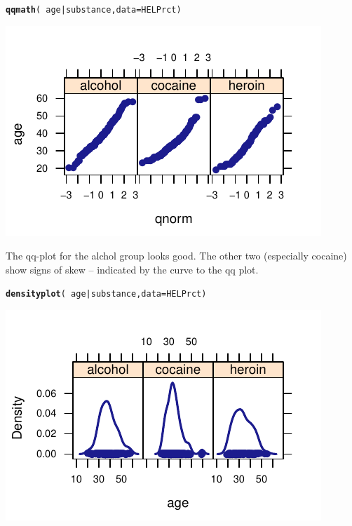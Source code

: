 \documentclass[twoside]{book}\usepackage[]{graphicx}\usepackage[]{xcolor}
\makeatletter
\def\maxwidth{ %
  \ifdim\Gin@nat@width>\linewidth
    \linewidth
  \else
    \Gin@nat@width
  \fi
}
\newcommand{\hlopt}[1]{\textcolor[rgb]{0,0,0}{#1}}%
\newcommand{\hlstd}[1]{\textcolor[rgb]{0.345,0.345,0.345}{#1}}%
\newcommand{\hlkwc}[1]{\textcolor[rgb]{0.333,0.667,0.333}{#1}}%
\newcommand{\hlkwd}[1]{\textcolor[rgb]{0.737,0.353,0.396}{\textbf{#1}}}%
\newenvironment{kframe}{%
 \def\at@end@of@kframe{}%
 \ifinner\ifhmode%
  \def\at@end@of@kframe{\end{minipage}}%
  \begin{minipage}{\columnwidth}%
 \fi\fi%
 \def\FrameCommand##1{\hskip\@totalleftmargin \hskip-\fboxsep
 \colorbox{shadecolor}{##1}\hskip-\fboxsep
     \hskip-\linewidth \hskip-\@totalleftmargin \hskip\columnwidth}%
 \MakeFramed {\advance\hsize-\width
   \@totalleftmargin\z@ \linewidth\hsize
   \@setminipage}}%
 {\par\unskip\endMakeFramed%
 \at@end@of@kframe}
\newenvironment{knitrout}{}{} %
\makeatother
\begin{document}
\begin{solution}
\begin{knitrout}
\color{fgcolor}\begin{kframe}
\begin{alltt}
\hlkwd{qqmath}\hlstd{(}\hlopt{~}\hlstd{age} \hlopt{|} \hlstd{substance,} \hlkwc{data} \hlstd{= HELPrct)}
\end{alltt}
\end{kframe}

{\centering \includegraphics[width=\maxwidth]{figures/fig-unnamed-chunk-121-1} 

}



\end{knitrout}
The qq-plot for the alchol group looks good.  The other two (especially cocaine) show
signs of skew -- indicated by the curve to the qq plot.
\begin{knitrout}
\color{fgcolor}\begin{kframe}
\begin{alltt}
\hlkwd{densityplot}\hlstd{(}\hlopt{~}\hlstd{age} \hlopt{|} \hlstd{substance,} \hlkwc{data} \hlstd{= HELPrct)}
\end{alltt}
\end{kframe}

{\centering \includegraphics[width=\maxwidth]{figures/fig-unnamed-chunk-122-1} 

}



\end{knitrout}
\end{solution}
\end{document}
